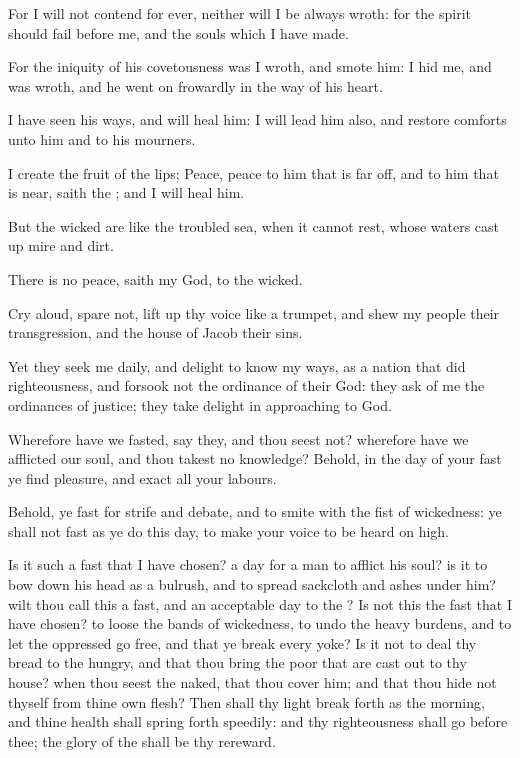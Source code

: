 \Verse For I will not contend for ever, neither will I be always wroth: for the spirit should fail before me, and the souls which I have made.

\Verse For the iniquity of his covetousness was I wroth, and smote him: I hid me, and was wroth, and he went on frowardly in the way of his heart.

\Verse I have seen his ways, and will heal him: I will lead him also, and restore comforts unto him and to his mourners.

\Verse I create the fruit of the lips; Peace, peace to him that is far off, and to him that is near, saith the \LORD; and I will heal him.

\Verse But the wicked are like the troubled sea, when it cannot rest, whose waters cast up mire and dirt.

\Verse There is no peace, saith my God, to the wicked.


\Chapter
\Verse Cry aloud, spare not, lift up thy voice like a trumpet, and shew my people their transgression, and the house of Jacob their sins.

\Verse Yet they seek me daily, and delight to know my ways, as a nation that did righteousness, and forsook not the ordinance of their God: they ask of me the ordinances of justice; they take delight in approaching to God.

\Verse Wherefore have we fasted, say they, and thou seest not? wherefore have we afflicted our soul, and thou takest no knowledge? Behold, in the day of your fast ye find pleasure, and exact all your labours.

\Verse Behold, ye fast for strife and debate, and to smite with the fist of wickedness: ye shall not fast as ye do this day, to make your voice to be heard on high.

\Verse Is it such a fast that I have chosen? a day for a man to afflict his soul? is it to bow down his head as a bulrush, and to spread sackcloth and ashes under him? wilt thou call this a fast, and an acceptable day to the \LORD?  \Verse Is not this the fast that I have chosen? to loose the bands of wickedness, to undo the heavy burdens, and to let the oppressed go free, and that ye break every yoke?  \Verse Is it not to deal thy bread to the hungry, and that thou bring the poor that are cast out to thy house? when thou seest the naked, that thou cover him; and that thou hide not thyself from thine own flesh?  \Verse Then shall thy light break forth as the morning, and thine health shall spring forth speedily: and thy righteousness shall go before thee; the glory of the \LORD shall be thy rereward.

